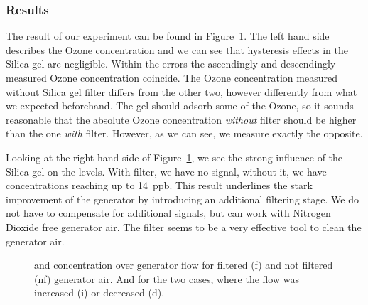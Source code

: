 \subsubsection{Results}
\label{sec:silica-results}

The result of our experiment can be found in
Figure~\ref{fig:o3-flow}. The left hand side describes the Ozone
concentration and we can see that hysteresis effects in the Silica gel
are negligible. Within the errors the ascendingly and descendingly
measured Ozone concentration coincide. The Ozone concentration
measured without Silica gel filter differs from the other two, however
differently from what we expected beforehand. The gel should adsorb
some of the Ozone, so it sounds reasonable that the absolute Ozone
concentration \emph{without} filter should be higher than the one
\emph{with} filter. However, as we can see, we measure exactly the
opposite. 

Looking at the right hand side of Figure~\ref{fig:o3-flow}, we see the
strong influence of the Silica gel on the  levels. With
filter, we have no  signal, without it, we have concentrations
reaching up to \SI{14}{ppb}. This result underlines the stark
improvement of the generator by introducing an additional filtering
stage. We do not have to compensate for additional  signals,
but can work with Nitrogen Dioxide free generator air. The filter
seems to be a very effective tool to clean the generator air.

\begin{figure}[htbp]
  \centering
  
  \hfill
  
  \caption{ and  concentration over generator flow for
    filtered (f) and not filtered (nf) generator air. And for the two
    cases, where the flow was increased (i) or decreased (d).}
  \label{fig:o3-flow}
\end{figure}

